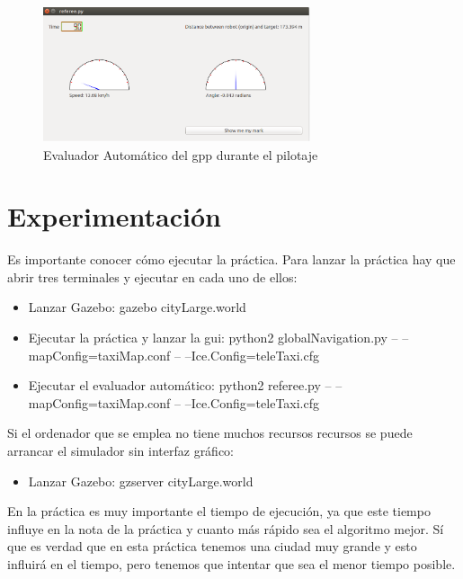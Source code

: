 \begin{figure}[H]
  \begin{center}
    \includegraphics[width=0.7\textwidth]{figures/GPP/referee2_gpp.png}
		\caption{Evaluador Automático del \acrshort{gpp} durante el pilotaje}
		\label{fig.referee2_gpp}
		\end{center}
\end{figure}


\section{Experimentación}
Es importante conocer cómo ejecutar la práctica. Para lanzar la práctica hay que abrir tres terminales y ejecutar en cada uno de ellos:

\begin{itemize}
\item Lanzar Gazebo: gazebo cityLarge.world
\item	Ejecutar la práctica y lanzar la \acrshort{gui}: python2 globalNavigation.py -- --mapConfig=taxiMap.conf -- --Ice.Config=teleTaxi.cfg
\item	Ejecutar el evaluador automático: python2 referee.py -- --mapConfig=taxiMap.conf -- --Ice.Config=teleTaxi.cfg
\end{itemize}

Si el ordenador que se emplea no tiene muchos recursos recursos se puede arrancar el simulador sin interfaz gráfico:

\begin{itemize}
\item Lanzar Gazebo: gzserver cityLarge.world
\end{itemize}

En la práctica es muy importante el tiempo de ejecución, ya que este tiempo influye en la nota de la práctica y cuanto más rápido sea el algoritmo mejor. Sí que es verdad que en esta práctica tenemos una ciudad muy grande y esto influirá en el tiempo, pero tenemos que intentar que sea el menor tiempo posible.\\

